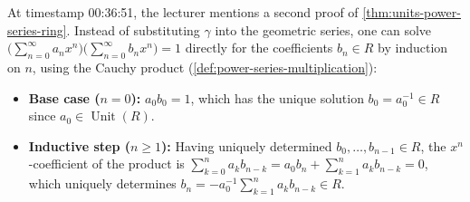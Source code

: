 \begin{proofWrapper}
\end{proofWrapper}

\begin{aiNote}
At timestamp 00:36:51, the lecturer mentions a second proof of \cref{thm:units-power-series-ring}. Instead of substituting $\gamma$ into the geometric series, one can solve $\bigl(\sum_{n=0}^\infty a_n x^n\bigr)\bigl(\sum_{n=0}^\infty b_n x^n\bigr) = 1$ directly for the coefficients $b_n \in R$ by induction on $n$, using the Cauchy product (\cref{def:power-series-multiplication}):
\begin{itemize}
    \item \textbf{Base case ($n = 0$):} $a_0 b_0 = 1$, which has the unique solution $b_0 = a_0^{-1} \in R$ since $a_0 \in \operatorname{Unit}(R)$.
    \item \textbf{Inductive step ($n \ge 1$):} Having uniquely determined $b_0, \dots, b_{n-1} \in R$, the $x^n$-coefficient of the product is $\sum_{k=0}^n a_k b_{n-k} = a_0 b_n + \sum_{k=1}^n a_k b_{n-k} = 0$, which uniquely determines $b_n = -a_0^{-1} \sum_{k=1}^n a_k b_{n-k} \in R$.
\end{itemize}
\end{aiNote}

